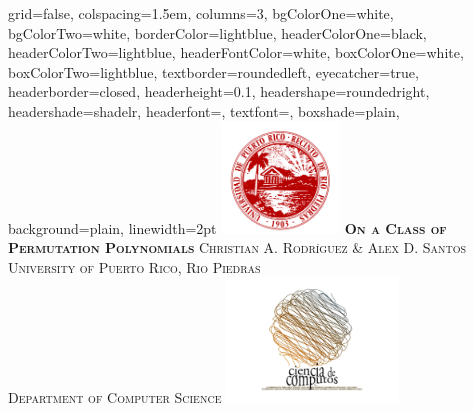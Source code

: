 \documentclass[landscape,final,paperwidth=48in,paperheight=38in]{baposter}
\begin{document}
\begin{poster}%
  {
  grid=false,
  colspacing=1.5em,
  columns=3,
  bgColorOne=white,
  bgColorTwo=white,
  borderColor=lightblue,
  headerColorOne=black,
  headerColorTwo=lightblue,
  headerFontColor=white,
  boxColorOne=white,
  boxColorTwo=lightblue,
  textborder=roundedleft,
  eyecatcher=true,
  headerborder=closed,
  headerheight=0.1\textheight,
  headershape=roundedright,
  headershade=shadelr,
  headerfont=\Large\textsc, %
  textfont=\large{\setlength{\parindent}{1.5em}},
  boxshade=plain,
  background=plain,
  linewidth=2pt
  }
  {\includegraphics[height=8em,keepaspectratio=true]{images/logo_uprrp}} 
  {\bf\textsc{On a Class of Permutation Polynomials}\vspace{0.1em}}
  {\textsc{Christian A. Rodr\'{\i}guez \& Alex D. Santos \\ University of Puerto Rico, Rio Piedras \\ Department of Computer Science}}
  {%
    \includegraphics[height=9em,keepaspectratio=true]{images/logo_ccom}
  }

    \newcommand{\colouredcircle}{%
      \tikz{\useasboundingbox (-0.2em,-0.32em) rectangle(0.2em,0.32em); \draw[draw=black,fill=lightblue,line width=0.03em] (0,0) circle(0.18em);}}


\end{poster}
\end{document}
